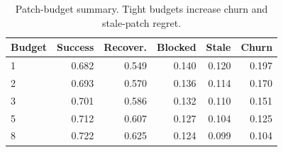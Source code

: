 \begin{table}[t]
\centering
\caption{Patch-budget summary. Tight budgets increase churn and stale-patch regret.}
\label{tab:patch-budget}
\small
\begin{tabular}{lrrrrr}
\toprule
Budget & Success & Recover. & Blocked & Stale & Churn \\
\midrule
1 & 0.682 & 0.549 & 0.140 & 0.120 & 0.197 \\
2 & 0.693 & 0.570 & 0.136 & 0.114 & 0.170 \\
3 & 0.701 & 0.586 & 0.132 & 0.110 & 0.151 \\
5 & 0.712 & 0.607 & 0.127 & 0.104 & 0.125 \\
8 & 0.722 & 0.625 & 0.124 & 0.099 & 0.104 \\
\bottomrule
\end{tabular}
\end{table}
